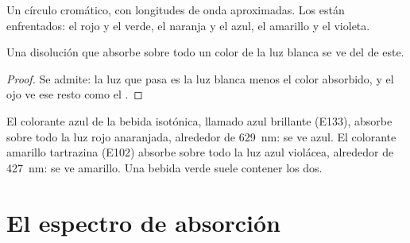 \begin{omfigure}

{\small Un círculo cromático, con longitudes de onda aproximadas. Los
 están enfrentados: el rojo y el verde, el
naranja y el azul, el amarillo y el violeta.}
\end{omfigure}

\begin{proposition}\label{prop:g11:absorbance:colour-seen}
Una disolución que absorbe sobre todo un color de la luz blanca se ve
del  de este.
\end{proposition}

\begin{proof}
Se admite: la luz que pasa es la luz blanca menos el color absorbido, y
el ojo ve ese resto como el .
\end{proof}

\begin{example}\label{ex:g11:absorbance:dyes}
El colorante azul de la bebida isotónica, llamado azul brillante
(E133), absorbe sobre todo la luz rojo anaranjada, alrededor de
\qty{629}{nm}: se ve azul. El colorante amarillo tartrazina (E102)
absorbe sobre todo la luz azul violácea, alrededor de \qty{427}{nm}: se
ve amarillo. Una bebida verde suele contener los dos.
\end{example}

\section{El espectro de absorción}

